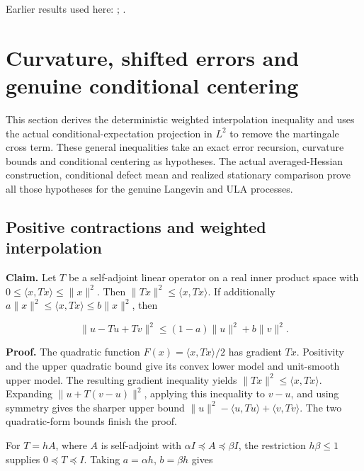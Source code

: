 \documentclass[11pt,a4paper]{report}
\begin{document}
Earlier results used here: \cite[Section~3.13.2]{LangevinLean2026ULASC}; \cite[Section~3.13.5]{LangevinLean2026ULASC}.
\section{\texorpdfstring{Curvature, shifted errors and genuine conditional centering}{Curvature, shifted errors and genuine conditional centering}}
\label{proof-module-WassersteinMixing-ShiftedEnergy-lean}


This section derives the deterministic weighted interpolation inequality and uses the actual conditional-expectation projection in \(L^2\) to remove the martingale cross term. These general inequalities take an exact error recursion, curvature bounds and conditional centering as hypotheses. The actual averaged-Hessian construction, conditional defect mean and realized stationary comparison prove all those hypotheses for the genuine Langevin and ULA processes.

\subsection{\texorpdfstring{Positive contractions and weighted interpolation}{Positive contractions and weighted interpolation}}
\label{report-step-WassersteinMixing-ShiftedEnergy-lean-1}


\textbf{Claim.} Let \(T\) be a self-adjoint linear operator on a real inner product space with \(0\le\langle x,Tx\rangle\le\|x\|^2\). Then \(\|Tx\|^2\le\langle x,Tx\rangle\). If additionally \(a\|x\|^2\le\langle x,Tx\rangle\le b\|x\|^2\), then

\[\|u-Tu+Tv\|^2\le(1-a)\|u\|^2+b\|v\|^2.\]


\textbf{Proof.} The quadratic function \(F(x)=\langle x,Tx\rangle/2\) has gradient \(Tx\). Positivity and the upper quadratic bound give its convex lower model and unit-smooth upper model. The resulting gradient inequality yields \(\|Tx\|^2\le\langle x,Tx\rangle\). Expanding \(\|u+T(v-u)\|^2\), applying this inequality to \(v-u\), and using symmetry gives the sharper upper bound \(\|u\|^2-\langle u,Tu\rangle+\langle v,Tv\rangle\). The two quadratic-form bounds finish the proof.




For \(T=hA\), where \(A\) is self-adjoint with \(\alpha I\preceq A\preceq\beta I\), the restriction \(h\beta\le1\) supplies \(0\preceq T\preceq I\). Taking \(a=\alpha h\), \(b=\beta h\) gives
\end{document}
